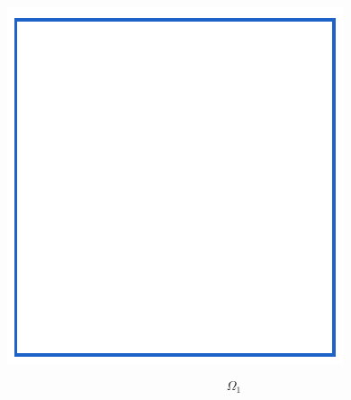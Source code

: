 \documentclass[crop, fleqn]{standalone}
\begin{document}
\begin{minipage}{60pt}
    \includegraphics[width=\linewidth]{main-theorem/rho-1.pdf}

    \vspace*{-30pt}

    \[ \Omega_{1} \]

    \vspace*{2pt}
\end{minipage}
\hspace{3pt}
\end{document}
